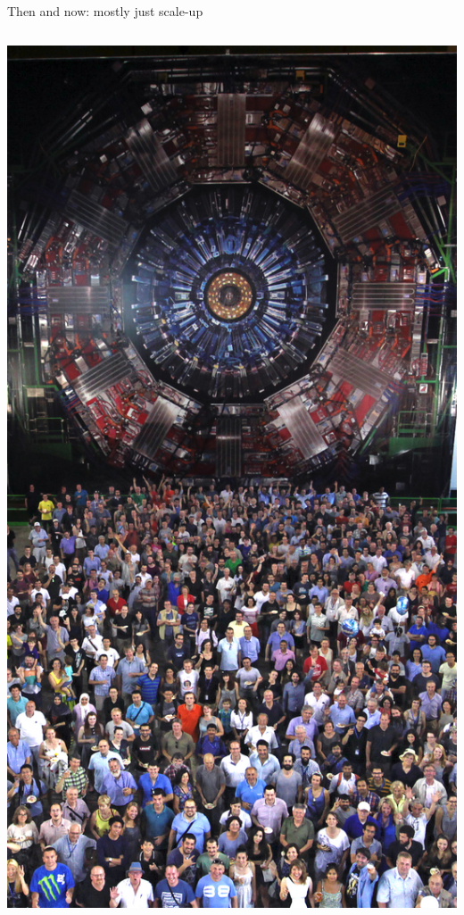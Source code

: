 \documentclass[aspectratio=169]{beamer}
\begin{document}
\begin{frame}{Then and now: mostly just scale-up}
\begin{columns}
\includegraphics[width=\linewidth]{cms25_2.jpg}
\end{columns}
\end{frame}
\end{document}
